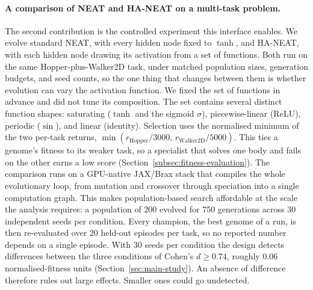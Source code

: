 \documentclass[12pt]{article}
\newcommand{\revGram}[2]{#2}
\newcommand{\revNota}[2]{#2}
\begin{document}
\paragraph{A comparison of NEAT and HA-NEAT on a multi-task problem.}
The second contribution is the controlled experiment this interface enables.
We evolve standard NEAT, with every hidden node fixed to $\tanh$, and HA-NEAT, with each hidden node drawing its activation from a set of functions.
Both run on the same Hopper-plus-Walker2D task, under matched population sizes, generation budgets, and seed counts, so the one thing that changes between them is whether evolution can vary the activation function.
We fixed the set of functions in advance and did not tune its composition.
\revGram{G-01}{The set contains several distinct function shapes}: \revNota{N-08}{saturating ($\tanh$ and the sigmoid $\sigma$)}, piecewise-linear (ReLU), periodic ($\sin$), and linear (identity).
Selection uses the normalised minimum of the two per-task returns, $\min(r_{\text{Hopper}}/3000,\, r_{\text{Walker2D}}/5000)$.
This ties a genome's fitness to its weaker task, so a specialist that solves one body and fails on the other earns a low score (Section~\ref{subsec:fitness-evaluation}).
The comparison runs on a GPU-native JAX/Brax stack \parencite{freeman_brax_2021,wang_tensorized_2024} that compiles the whole evolutionary loop, from mutation and crossover through speciation into a single computation graph.
This makes population-based search affordable at the scale the analysis requires: a population of 200 evolved for 750 generations across 30 independent seeds per condition.
Every champion, the best genome of a run, is then re-evaluated over 20 held-out episodes per task, so no reported number depends on a single episode.
With 30 seeds per condition the design detects differences between the three conditions of Cohen's $d \geq 0.74$, roughly 0.06 normalised-fitness units (Section~\ref{sec:main-study}). An absence of difference therefore rules out large effects. Smaller ones could go undetected.
\end{document}
